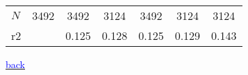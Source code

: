 \documentclass[9pt,letterpaper,subeqn]{beamer}
\begin{document}
\begin{frame}[label=placebo1]
\begin{table}[htbp]
\begin{tabular}{l*{6}{c}}
\hline
\(N\)       &        3492         &        3492         &        3124         &        3492         &        3124         &        3124         \\
r2          &                     &       0.125         &       0.128         &       0.125         &       0.129         &       0.143         \\
\hline\hline
\end{tabular}
\end{table}


{\footnotesize \hyperlink{placebos}{\textcolor{blue}{back}}}
\end{frame}
\end{document}
